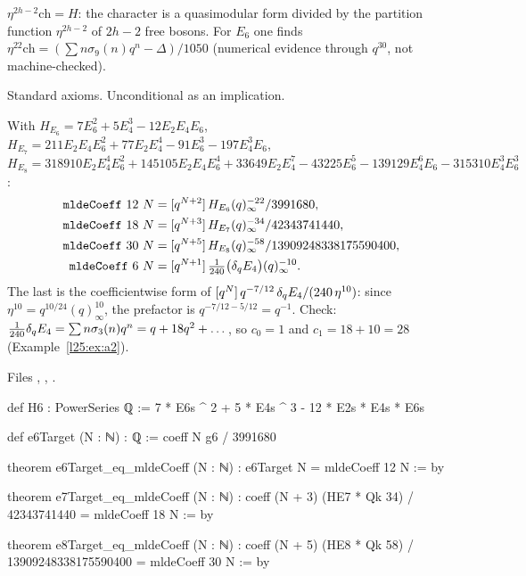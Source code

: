 \begin{physics}
$\eta^{2h-2}\mathrm{ch}=H$: the character is a quasimodular form divided by the partition function $\eta^{2h-2}$ of
$2h-2$ free bosons. For $E_6$ one finds $\eta^{22}\mathrm{ch}=(\sum n\sigma_9(n)q^n-\Delta)/1050$ (numerical evidence
through $q^{30}$, not machine-checked).
\end{physics}
\begin{status}
Standard axioms. Unconditional as an implication.
\end{status}

\begin{theorem}\label{l25:thm:closed}
With $H_{E_6}=7E_6^2+5E_4^3-12E_2E_4E_6$, $H_{E_7}=211E_2E_4E_6^2+77E_2E_4^4-91E_6^3-197E_4^3E_6$,
$H_{E_8}=318910E_2E_4^4E_6^2+145105E_2E_4E_6^4+33649E_2E_4^7-43225E_6^5-139129E_4^6E_6-315310E_4^3E_6^3$:
\begin{align*}
\mathtt{mldeCoeff}\ 12\ N&=[q^{N+2}]\,H_{E_6}(q)_\infty^{-22}/3991680,\\
\mathtt{mldeCoeff}\ 18\ N&=[q^{N+3}]\,H_{E_7}(q)_\infty^{-34}/42343741440,\\
\mathtt{mldeCoeff}\ 30\ N&=[q^{N+5}]\,H_{E_8}(q)_\infty^{-58}/13909248338175590400,\\
\mathtt{mldeCoeff}\ 6\ N&=[q^{N+1}]\,\tfrac1{240}\big(\ltwentyfiveEu E_4\big)(q)_\infty^{-10}.
\end{align*}
The last is the coefficientwise form of $[q^N]\,q^{-7/12}\,\delta_q E_4/(240\,\eta^{10})$: since
$\eta^{10}=q^{10/24}(q)_\infty^{10}$, the prefactor is $q^{-7/12-5/12}=q^{-1}$. Check: $\frac1{240}\delta_q E_4=\sum
n\sigma_3(n)q^n=q+18q^2+\dots$, so $c_0=1$ and $c_1=18+10=28$ (Example~\ref{l25:ex:a2}).
\end{theorem}
\noindent Files ,
, .
\begin{leancode}
def H6 : PowerSeries ℚ := 7 * E6s ^ 2 + 5 * E4s ^ 3 - 12 * E2s * E4s * E6s

def e6Target (N : ℕ) : ℚ := coeff N g6 / 3991680

theorem e6Target_eq_mldeCoeff (N : ℕ) : e6Target N = mldeCoeff 12 N := by
\end{leancode}
\begin{leancode}
theorem e7Target_eq_mldeCoeff (N : ℕ) :
    coeff (N + 3) (HE7 * Qk 34) / 42343741440 = mldeCoeff 18 N := by

theorem e8Target_eq_mldeCoeff (N : ℕ) :
    coeff (N + 5) (HE8 * Qk 58) / 13909248338175590400 = mldeCoeff 30 N := by
\end{leancode}
